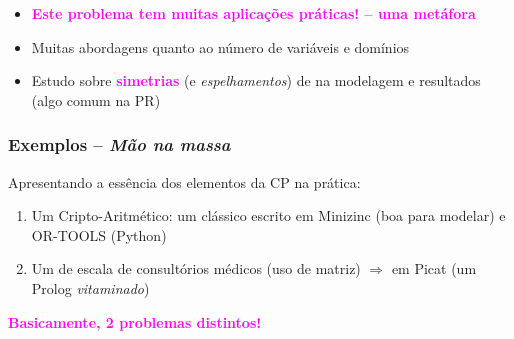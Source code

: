 \documentclass{beamer}
\begin{document}
\begin{frame}[fragile, allowframebreaks=0.9]
\begin{footnotesize}
\begin{itemize}
  \item \textcolor{magenta}{\textbf{Este problema tem muitas aplicações práticas! -- uma metáfora}} 
  \item Muitas abordagens quanto ao número de variáveis e domínios
  \item Estudo sobre \textcolor{magenta}{\textbf{simetrias}} (e \textit{espelhamentos}) de na modelagem e  resultados (algo comum na PR)
\end{itemize}

\end{footnotesize}
\end{frame}



\begin{frame}[fragile] 

\frametitle{Exemplos -- {\em Mão na massa}}

Apresentando a essência dos elementos da CP na prática:

\begin{block}{}
\begin{enumerate}

  \item Um Cripto-Aritmético: um clássico escrito em Minizinc (boa para modelar) e OR-TOOLS (Python)
  
   \item Um de escala de consultórios médicos (uso de matriz)   $\Rightarrow $ em Picat (um Prolog {\em vitaminado})

\end{enumerate}
\end{block}

 \begin{center}
  \textbf{\textcolor{magenta}{Basicamente, 2 problemas distintos!}}\\

 \end{center}

\end{frame}
\end{document}
